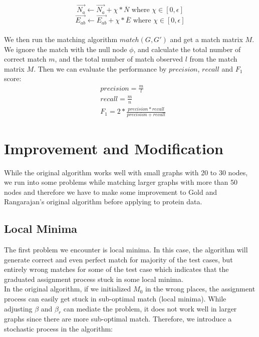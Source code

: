 \begin{equation} 
\overrightarrow{N_{a}} \leftarrow \overrightarrow{N_{a}}  + \chi*\overline{N} \text{ where } \chi \in [0,\epsilon]
\end{equation}
\begin{equation} 
\overrightarrow{E_{ab}} \leftarrow \overrightarrow{E_{ab}}  + \chi*\overline{E} \text{ where } \chi \in [0,\epsilon]
\end{equation}\\

We then run the matching algorithm $match(G,G')$ and get a match matrix $M$. We ignore the match with the null node $\phi$, and calculate the total number of correct match $m$, and the total number of match observed $l$ from the match matrix $M$. Then we can evaluate the performance by $precision$, $recall$ and $F_1$ score:
\begin{align} 
& precision = \frac{m}{l}\\
& recall = \frac{m}{n}\\
& F_1 =2*\frac{precision*recall}{precision+recall}
\end{align}

\section{Improvement and Modification}

While the original algorithm works well with small graphs with 20 to 30 nodes, we run into some problems while matching larger graphs with more than 50 nodes and therefore we have to make some improvement to Gold and Rangarajan's original algorithm before applying to protein data.

\subsection{Local Minima}

The first problem we encounter is local minima. In this case, the algorithm will generate correct and even perfect match for majority of the test cases, but entirely wrong matches for some of the test case which indicates that the graduated assignment process stuck in some local minima.\\

In the original algorithm, if we initialized $M_0$ in the wrong places, the assignment process can easily get stuck in sub-optimal match (local minima). While adjusting $\beta$ and $\beta_r$ can mediate the problem, it does not work well in larger graphs since there are more sub-optimal match. Therefore, we introduce a stochastic process in the algorithm:

